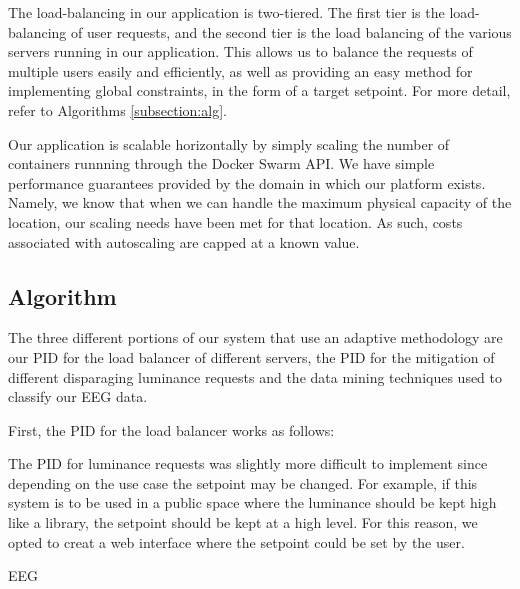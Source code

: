 \documentclass[10pt,twocolumn,letterpaper]{article}
\begin{document}
The load-balancing in our application is two-tiered. The first tier is the
load-balancing of user requests, and the second tier is the load balancing of
the various servers running in our application. This allows us to balance the
requests of multiple users easily and efficiently, as well as providing an easy
method for implementing global constraints, in the form of a target setpoint.
For more detail, refer to Algorithms \ref{subsection:alg}.

Our application is scalable horizontally by simply scaling the number of
containers runnning through the Docker Swarm API. We have simple performance
guarantees provided by the domain in which our platform exists. Namely, we know
that when we can handle the maximum physical capacity of the location, our
scaling needs have been met for that location. As such, costs associated with
autoscaling are capped at a known value.

\subsection{Algorithm}

The three different portions of our system that use an adaptive methodology are our PID for the load balancer of different servers,
the PID for the mitigation of different disparaging luminance requests and the data mining techniques used to classify our EEG data. 

First, the PID for the load balancer works as follows: 

The PID for luminance requests was slightly more difficult to implement since depending on the use case the setpoint may be changed. For example, if this system is to be used in a public space where the luminance should be kept high like a library, the setpoint should be kept at a high level. For this reason, we opted to creat a web interface where the setpoint could be set by the user.

EEG

\label{subsection:alg}
\end{document}
